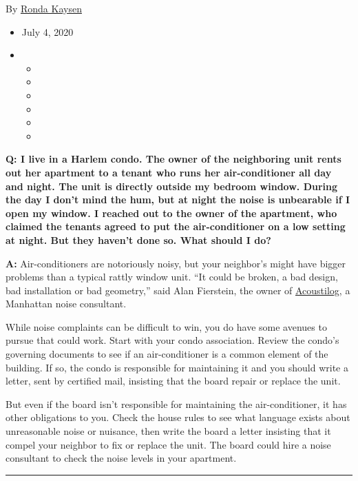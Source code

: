 By \href{https://www.nytimes3xbfgragh.onion/by/ronda-kaysen}{Ronda
Kaysen}

\begin{itemize}
\item
  July 4, 2020
\item
  \begin{itemize}
  \item
  \item
  \item
  \item
  \item
  \item
  \end{itemize}
\end{itemize}

\textbf{Q: I live in a Harlem condo. The owner of the neighboring unit
rents out her apartment to a tenant who runs her air-conditioner all day
and night. The unit is directly outside my bedroom window. During the
day I don't mind the hum, but at night the noise is unbearable if I open
my window. I reached out to the owner of the apartment, who claimed the
tenants agreed to put the air-conditioner on a low setting at night. But
they haven't done so. What should I do?}

\textbf{A:} Air-conditioners are notoriously noisy, but your neighbor's
might have bigger problems than a typical rattly window unit. ``It could
be broken, a bad design, bad installation or bad geometry,'' said Alan
Fierstein, the owner of \href{https://www.acoustilog.com/}{Acoustilog},
a Manhattan noise consultant.

While noise complaints can be difficult to win, you do have some avenues
to pursue that could work. Start with your condo association. Review the
condo's governing documents to see if an air-conditioner is a common
element of the building. If so, the condo is responsible for maintaining
it and you should write a letter, sent by certified mail, insisting that
the board repair or replace the unit.

But even if the board isn't responsible for maintaining the
air-conditioner, it has other obligations to you. Check the house rules
to see what language exists about unreasonable noise or nuisance, then
write the board a letter insisting that it compel your neighbor to fix
or replace the unit. The board could hire a noise consultant to check
the noise levels in your apartment.

\begin{center}\rule{0.5\linewidth}{\linethickness}\end{center}


